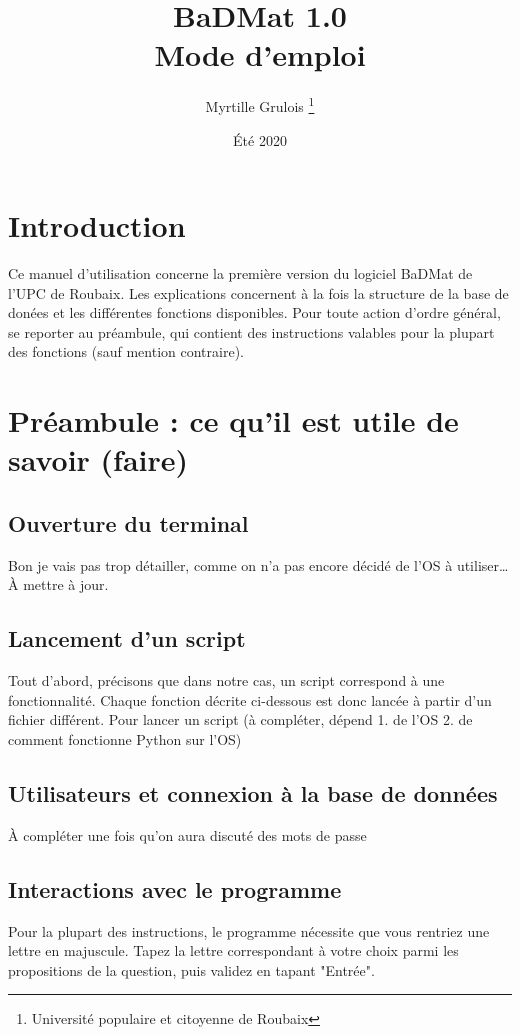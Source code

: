 \documentclass[12pt,a4paper]{article}
\title{\Huge BaDMat 1.0 \\ \LARGE Mode d'emploi} %
\author{Myrtille Grulois \thanks{Université populaire et citoyenne de Roubaix}}
\date{Été 2020}
\begin{document}
\begin{titlepage}
\maketitle
\end{titlepage}

\tableofcontents
\clearpage

\section*{Introduction}

Ce manuel d'utilisation concerne la première version du logiciel BaDMat de l'UPC de Roubaix.
Les explications concernent à la fois la structure de la base de donées et les différentes fonctions disponibles.
Pour toute action d'ordre général, se reporter au préambule, qui contient des instructions valables pour la plupart des fonctions (sauf mention contraire).

\bigskip
\section{Préambule : ce qu'il est utile de savoir (faire)}

\subsection{Ouverture du terminal}

    Bon je vais pas trop détailler, comme on n'a pas encore décidé de l'OS à utiliser\dots
    À mettre à jour.

\subsection{Lancement d'un script}
    Tout d'abord, précisons que dans notre cas, un script correspond à une fonctionnalité.
    Chaque fonction décrite ci-dessous est donc lancée à partir d'un fichier différent.
    Pour lancer un script (à compléter, dépend 1. de l'OS 2. de comment fonctionne Python sur l'OS)

\subsection{Utilisateurs et connexion à la base de données}
    À compléter une fois qu'on aura discuté des mots de passe

\subsection{Interactions avec le programme}
    Pour la plupart des instructions, le programme nécessite que vous rentriez une lettre en majuscule.
    Tapez la lettre correspondant à votre choix parmi les propositions de la question,
    puis validez en tapant "Entrée".
\end{document}
